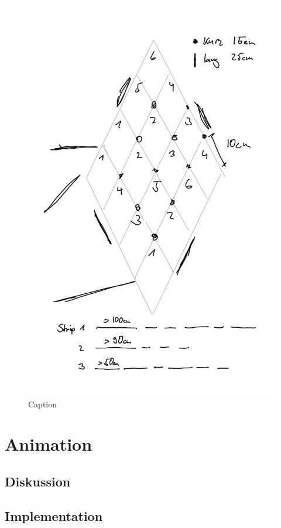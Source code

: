         \begin{figure}[H]
            \begin{center}
                \includegraphics[width=12cm]{media/03_technical_implementation/leds_3.png}
            \end{center}
            \caption{Caption}
            \label{fig:leds_3}
        \end{figure}




\section{Animation}
    \subsection{Diskussion}

    \subsection{Implementation}

